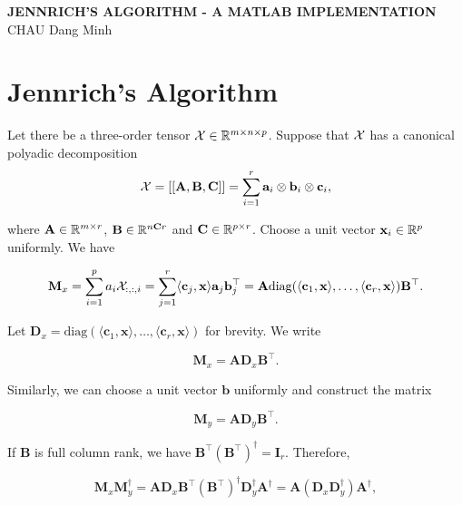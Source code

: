 \begin{center}
    \vspace{0.5cm}
    \textbf{\Large JENNRICH'S ALGORITHM - A MATLAB IMPLEMENTATION} \\
    \vspace{0.5cm}
    CHAU Dang Minh
\end{center}

\section{Jennrich's Algorithm}
Let there be a three-order tensor $\mathcal{X}\in{\mathbb{R}}^{m\times n\times p}$. Suppose that $\mathcal{X}$ has a canonical polyadic decomposition
\begin{equation}
    \mathcal{X} = [[\mathbf{A}, \mathbf{B}, \mathbf{C}]] = \sum\limits_{i=1}^{r} \mathbf{a}_i\otimes \mathbf{b}_i\otimes \mathbf{c}_i,
\end{equation}

where $\mathbf{A}\in{\mathbb{R}}^{m\times r}$, $\mathbf{B}\in{\mathbb{R}}^{n\mathbf{C} r}$  and $\mathbf{C}\in{\mathbb{R}}^{p\times r}$. Choose a unit vector $\mathbf{x}_i\in{\mathbb{R}}^p$ uniformly. We have

\begin{equation}
    \mathbf{M}_x = \sum\limits_{i=1}^{p} a_i\mathcal{X}_{:,:,i} = \sum\limits_{j=1}^{r} \langle \mathbf{c}_j, \mathbf{x} \rangle \mathbf{a}_j\mathbf{b}_j^\top = \mathbf{A}\mathrm{diag}(\langle \mathbf{c}_1, \mathbf{x} \rangle, \ldots, \langle \mathbf{c}_r, \mathbf{x} \rangle) \mathbf{B}^\top.
\end{equation}

Let $\mathbf{D}_x = \mathrm{diag}(\langle \mathbf{c}_1, \mathbf{x} \rangle, \ldots, \langle \mathbf{c}_r, \mathbf{x} \rangle)$ for brevity. We write

\begin{equation}
    \mathbf{M}_x = \mathbf{A} \mathbf{D}_x \mathbf{B}^\top.
\end{equation}

Similarly, we can choose a unit vector $\mathbf{b}$ uniformly and construct the matrix

\begin{equation}
    \mathbf{M}_y = \mathbf{A} \mathbf{D}_y \mathbf{B}^\top.
\end{equation}

If $\mathbf{B}$ is full column rank, we have $\mathbf{B}^\top (\mathbf{B}^\top)^\dag = \mathbf{I}_r$. Therefore,

\begin{equation}
    \mathbf{M}_x\mathbf{M}_y^\dag = \mathbf{A} \mathbf{D}_x \mathbf{B}^\top (\mathbf{B}^\top)^\dag \mathbf{D}_y^\dag \mathbf{A}^\dag = \mathbf{A}(\mathbf{D}_x \mathbf{D}_y^\dag) \mathbf{A}^\dag,
\end{equation}

